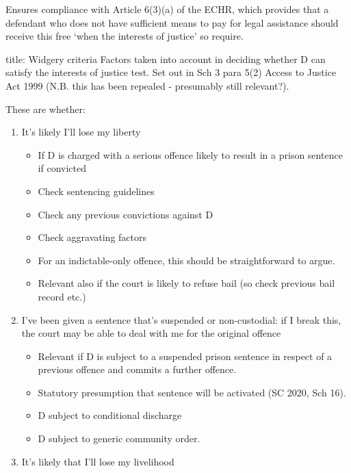 \documentclass[
]{article}
\newenvironment{Shaded}{}{}
\newcommand{\NormalTok}[1]{#1}
\providecommand{\tightlist}{%
  \setlength{\itemsep}{0pt}\setlength{\parskip}{0pt}}
\begin{document}
Ensures compliance with Article 6(3)(a) of the ECHR, which provides that
a defendant who does not have sufficient means to pay for legal
assistance should receive this free `when the interests of justice' so
require.

\begin{Shaded}
\begin{Highlighting}[]
\NormalTok{title: Widgery criteria}
\NormalTok{Factors taken into account in deciding whether D can satisfy the interests of justice test. Set out in Sch 3 para 5(2) Access to Justice Act 1999 (N.B. this has been repealed {-} presumably still relevant?). }
\end{Highlighting}
\end{Shaded}

These are whether:

\begin{enumerate}
\def\labelenumi{\arabic{enumi}.}
\tightlist
\item
  It's likely I'll lose my liberty

  \begin{itemize}
  \tightlist
  \item
    If D is charged with a serious offence likely to result in a prison
    sentence if convicted
  \item
    Check sentencing guidelines
  \item
    Check any previous convictions against D
  \item
    Check aggravating factors
  \item
    For an indictable-only offence, this should be straightforward to
    argue.
  \item
    Relevant also if the court is likely to refuse bail (so check
    previous bail record etc.)
  \end{itemize}
\item
  I've been given a sentence that's suspended or non-custodial: if I
  break this, the court may be able to deal with me for the original
  offence

  \begin{itemize}
  \tightlist
  \item
    Relevant if D is subject to a suspended prison sentence in respect
    of a previous offence and commits a further offence.
  \item
    Statutory presumption that sentence will be activated (SC 2020, Sch
    16).
  \item
    D subject to conditional discharge
  \item
    D subject to generic community order.
  \end{itemize}
\item
  It's likely that I'll lose my livelihood


\end{enumerate}
\end{document}
